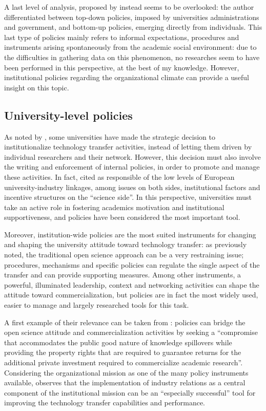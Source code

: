 A last level of analysis, proposed by \citet{Rasmussen2006} instead seems to be overlooked: the author differentiated between top-down policies, imposed by universities administrations and government, and bottom-up policies, emerging directly from individuals. This last type of policies mainly refers to informal expectations, procedures and instruments arising spontaneously from the academic social environment: due to the difficulties in gathering data on this phenomenon, no researches seem to have been performed in this perspective, at the best of my knowledge. However, institutional policies regarding the organizational climate can provide a useful insight on this topic.

\subsection{University-level policies}

As noted by \citet{Geuna2009}, some universities have made the strategic decision to institutionalize technology transfer activities, instead of letting them driven by individual researchers and their network. However, this decision must also involve the writing and enforcement of internal policies, in order to promote and manage these activities. In fact, \citet{Debackere2005} cited as responsible of the low levels of European university-industry linkages, among issues on both sides, institutional factors and incentive structures on the \enquote{science side}. In this perspective, universities must take an active role in fostering academics motivation and institutional supportiveness, and policies have been considered the most important tool.

Moreover, institution-wide policies are the most suited instruments for changing and shaping the university attitude toward technology transfer: as previously noted, the traditional open science approach can be a very restraining issue; procedures, mechanisms and specific policies can regulate the single aspect of the transfer and can provide supporting measures. Among other instruments, a powerful, illuminated leadership, context and networking activities can shape the attitude toward commercialization, but policies are in fact the most widely used, easier to manage and largely researched tools for this task. 

A first example of their relevance can be taken from \citet{Bercovitz2006}: policies can bridge the open science attitude and commercialization activities by seeking a \enquote{compromise that accommodates the public good nature of knowledge spillovers while providing the property rights that are required to guarantee returns for the additional private investment required to commercialize academic research}.  Considering the organizational mission as one of the many policy instruments available, \citet{Debackere2005} observes that the implementation of industry relations as a central component of the institutional mission can be an \enquote{especially successful} tool for improving the technology transfer capabilities and performance. 

